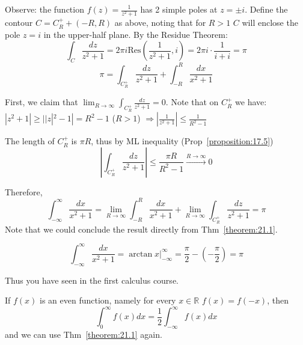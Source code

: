 \begin{soln}
     Observe: the function $f(z) = \frac{1}{z^2 + 1}$ has 2 simple poles at $z = \pm i$. Define the contour $C = C_R^+ + (-R, R)$ as above, noting that for $R > 1$ $C$ will enclose the 
     pole $z = i$ in the upper-half plane. By the Residue Theorem:
    \[
\int_C \frac{dz}{z^2 + 1} = 2\pi i \text{Res} \left( \frac{1}{z^2 + 1}, i \right) = 2\pi i \cdot \frac{1}{i+i} = \pi
\]
\[
\pi = \int_{C_R^+} \frac{dz}{z^2 + 1} + \int_{-R}^R \frac{dx}{x^2 + 1}
\]

First, we claim that $\lim_{R \to \infty} \int_{C_R^+} \frac{dz}{z^2 + 1} = 0$. Note that on $C_R^+$ we have:
$|z^2 + 1| \ge ||z|^2 - 1| = R^2 - 1$ ($R > 1$) $\Rightarrow |\frac{1}{z^2 + 1}| \le \frac{1}{R^2 - 1}$

The length of $C_R^+$ is $\pi R$, thus by ML inequality (Prop~\ref{proposition:17.5})
\[
\left| \int_{C_R^+} \frac{dz}{z^2 + 1} \right| \le \frac{\pi R}{R^2 - 1} \xrightarrow{R \to \infty} 0
\]

Therefore,
\[
    \int_{-\infty}^{\infty} \frac{dx}{x^2 + 1} = \lim_{R \to \infty} \int_{-R}^R \frac{dx}{x^2 + 1} + \lim_{R \to \infty} \int_{C_R^+} \frac{dz}{z^2 + 1} = \pi
\]
Note that we could conclude the result directly from Thm~\ref{theorem:21.1}.
\end{soln}

\begin{remark} \checkthis{} \[\int_{-\infty}^{\infty} \frac{dx}{x^2 + 1} = \arctan x \big|_{-\infty}^{\infty} = \frac{\pi}{2} - (-\frac{\pi}{2}) = \pi\]
\end{remark}

Thus you have seen in the first calculus course.

\begin{remark}\label{remark:20.37}
    If $f(x)$ is an even function, namely for every $x \in \mathbb{R}$ $f(x) = f(-x)$, then
    \[\int_0^{\infty} f(x) dx = \frac{1}{2} \int_{-\infty}^{\infty} f(x) dx
        \]
        and we can use Thm~\ref{theorem:21.1} again.
    \end{remark}

